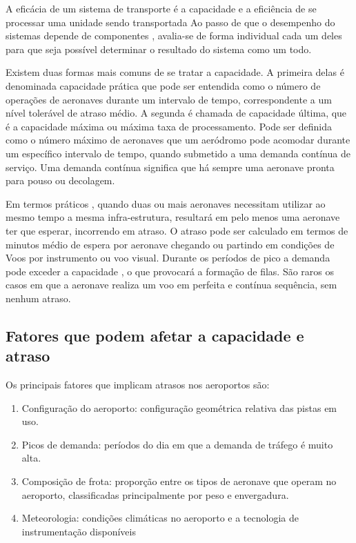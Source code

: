 \documentclass[12pt]{article}
\begin{document}
A eficácia de um sistema de transporte é a capacidade e a eficiência de
se processar uma unidade sendo transportada Ao passo de que o desempenho
do sistemas depende de componentes , avalia-se de forma individual cada
um deles para que seja possível determinar o resultado do sistema como 
um todo. 

Existem duas formas mais comuns de se tratar a capacidade. A primeira delas
é denominada capacidade prática que pode ser entendida como o número de 
operações de aeronaves durante um intervalo de tempo, correspondente a um
nível tolerável de atraso médio. A segunda é chamada de capacidade última,
que é a capacidade máxima ou máxima taxa de processamento. Pode ser 
definida como o número máximo de aeronaves que um aeródromo pode acomodar
durante um específico intervalo de tempo, quando submetido a uma demanda
contínua de serviço. Uma demanda contínua significa que há sempre uma 
aeronave pronta para pouso ou decolagem. 

Em termos práticos , quando duas ou mais aeronaves necessitam utilizar ao
mesmo tempo a mesma infra-estrutura, resultará em pelo menos uma aeronave 
ter que esperar, incorrendo em atraso. O atraso pode ser calculado em termos
de minutos médio de espera por aeronave chegando ou partindo em condições 
de Voos por instrumento ou voo visual. Durante os períodos de pico a demanda
pode exceder a capacidade , o que provocará a formação de filas. São raros
os casos em que a aeronave realiza um voo em perfeita e contínua sequência,
sem nenhum atraso. 

\subsection{Fatores que podem afetar a capacidade e atraso}

Os principais fatores que implicam atrasos nos aeroportos são:


\begin{enumerate}
  
  \item Configuração do aeroporto: configuração geométrica relativa das pistas 
    em uso.

  \item Picos de demanda: períodos do dia em que a demanda de tráfego é muito
    alta.

  \item Composição de frota: proporção entre os tipos de aeronave que operam no 
  aeroporto, classificadas principalmente por peso e envergadura.

  \item Meteorologia: condições climáticas no aeroporto e a tecnologia de 
  instrumentação disponíveis

\end{enumerate}
\end{document}
